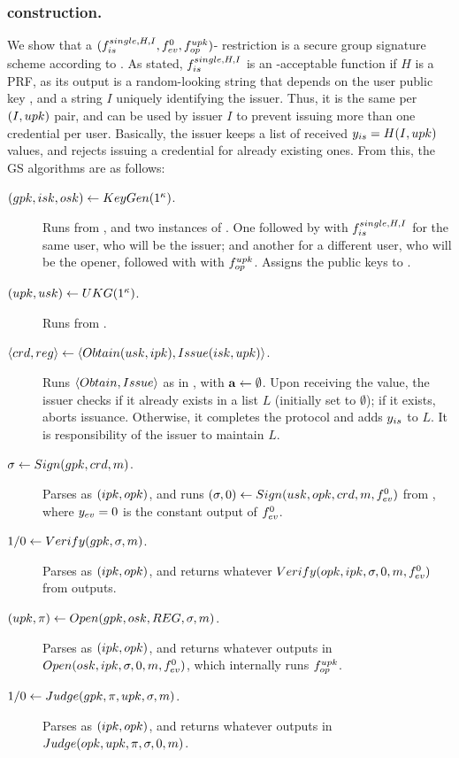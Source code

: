 \subsubsection{\CUASGS construction.} %
We show that a $(f_{is}^{single,H,I},f_{ev}^0,f_{op}^{upk})$-\CUASGen
restriction is a secure group signature scheme according to \cite{bsz05}.
As stated, $f_{is}^{single,H,I}$ is an \UAS-acceptable function if $H$ is a
PRF, as its output is a random-looking string that depends on the user public
key \upk, and a string $I$ uniquely identifying the issuer. Thus, it is the same
per $(I,upk)$ pair, and can be used by issuer $I$ to prevent issuing more than
one credential per user. Basically, the issuer keeps a list of received
$y_{is} = H(I,upk)$ values, and rejects issuing a credential for already
existing ones. From this, the GS algorithms are as follows:

\begin{description}
\item[$(gpk,isk,osk) \gets KeyGen(1^\kappa)$.] Runs \Setup from \CUASGen,
  and two instances of \KeyGen. One followed by \ISet with $f_{is}^{single,H,
    I}$ for the same user, who will be the issuer; and another for a different
  user, who will be the opener, followed with \OKeyGen with $f_{op}^{upk}$.
  Assigns the public keys to \gpk.
\item[$(upk,usk) \gets UKG(1^\kappa)$.] Runs \KeyGen from \CUASGen.
\item[$\langle crd,reg \rangle \gets
  \langle Obtain(usk,ipk),Issue(isk,upk)\rangle$.] Runs $\langle Obtain,
  Issue\rangle$ as in \CUASGen, with $\mathbf{a} \gets \emptyset$. Upon receiving
  the \yissue value, the issuer checks if it already exists in a list $L$
  (initially set to $\emptyset$); if it exists, aborts issuance. Otherwise, it
  completes the protocol and adds $y_{is}$ to $L$. It is responsibility of the
  issuer to maintain $L$.
\item[$\sigma \gets Sign(gpk,crd,m)$.] Parses \gpk as $(ipk,opk)$, and
  runs $(\sigma,0) \gets Sign(usk,opk,crd,m,f_{ev}^0)$ from \CUASGen,
  where $y_{ev} = 0$ is the constant output of $f_{ev}^0$.
\item[$1/0 \gets Verify(gpk,\sigma,m)$.] Parses \gpk as $(ipk,opk)$, and
  returns whatever $Verify(opk,ipk,\sigma,0,m,f_{ev}^0)$ from \CUASGen
  outputs.
\item[$(\upk,\pi) \gets \Open(\gpk,\osk,\trans,\sig,\msg)$.] Parses \gpk as
  $(ipk,opk)$, and returns whatever \CUASGen outputs in $Open(osk,ipk,\sigma,
  0,m,f_{ev}^0)$, which internally runs $f_{op}^{upk}$.
\item[$1/0 \gets Judge(gpk,\pi,upk,\sigma,m)$.] Parses \gpk as $(ipk,
  opk)$, and returns whatever \CUASGen outputs in $Judge(opk,upk,\pi,\sigma,
  0,m)$.
\end{description}

